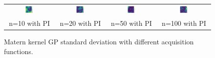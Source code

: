 \documentclass[11pt]{article}
\begin{document}
\begin{figure}[H]
\begin{tabular}{cccc}
        \includegraphics[width=0.225\textwidth]{../Task-02/plots/gp_std_matern_n10_PI.png} &
        \includegraphics[width=0.225\textwidth]{../Task-02/plots/gp_std_matern_n20_PI.png} &
        \includegraphics[width=0.225\textwidth]{../Task-02/plots/gp_std_matern_n50_PI.png} &
        \includegraphics[width=0.225\textwidth]{../Task-02/plots/gp_std_matern_n100_PI.png} \\
        n=10 with PI & n=20 with PI & n=50 with PI & n=100 with PI \\
    \end{tabular}
    \caption{Matern kernel GP standard deviation with different acquisition functions.}
    \label{fig:matern_gp_std}
\end{figure}
\end{document}
